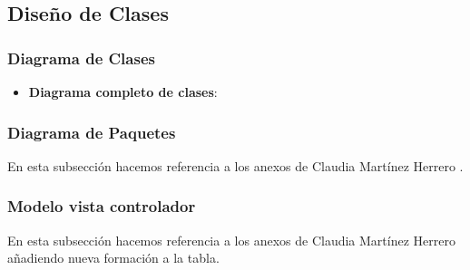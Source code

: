 \subsection{Diseño de Clases}

\subsubsection{Diagrama de Clases}

\begin{itemize}
	\tightlist
	\item
	\textbf{Diagrama completo de clases}:
	
	
	
\end{itemize}
\newpage
\subsubsection{Diagrama de Paquetes}

En esta subsección hacemos referencia a los anexos de Claudia Martínez Herrero \cite{claudia:anexo}.

\newpage
\subsubsection{Modelo vista controlador}

En esta subsección hacemos referencia a los anexos de Claudia Martínez Herrero \cite{claudia:anexo} añadiendo nueva formación a la tabla.


